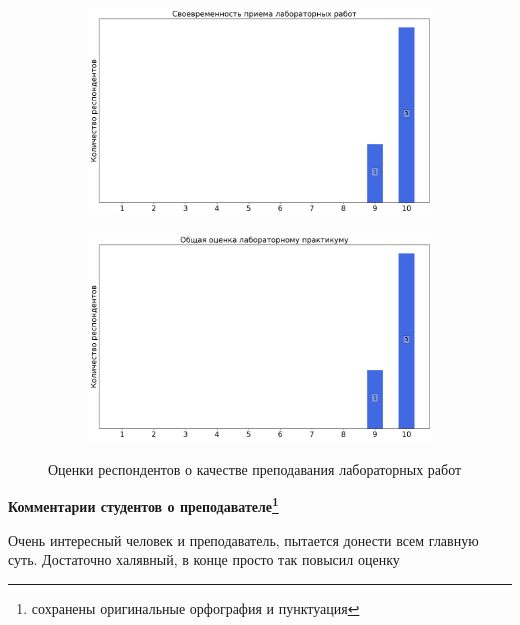 \begin{figure}[H]
\begin{subfigure}[b]{0.45\textwidth}
                    \centering
                    \includegraphics[width=\textwidth]{images/3 course/Общая физика - квантовая физика/labniks-marks-Жабин С.Н.-2.png}
                \end{subfigure}
                \begin{subfigure}[b]{0.45\textwidth}
                    \centering
                    \includegraphics[width=\textwidth]{images/3 course/Общая физика - квантовая физика/labniks-marks-Жабин С.Н.-3.png}
                \end{subfigure}	
                \caption{Оценки респондентов о качестве преподавания лабораторных работ}
            \end{figure}

            \textbf{Комментарии студентов о преподавателе\protect\footnote{сохранены оригинальные орфография и пунктуация}}
                \begin{commentbox} 
                    Очень интересный человек и преподаватель, пытается донести всем главную суть. Достаточно халявный, в конце просто так повысил оценку 
                \end{commentbox} 
            

